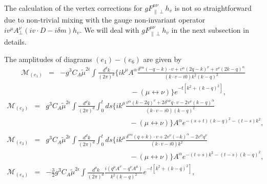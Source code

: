 The calculation of the vertex corrections for $gF^{\mu\nu}_{\|\perp}h_v$ is not so straightforward due to non-trivial mixing with the gauge non-invariant operator $iv^{\mu}A_{\perp}^{\nu}(iv\cdot D - i\delta m) h_v$.
We will deal with $gF^{\mu\nu}_{\|\perp}h_v$ in the next subsection in details. 

The amplitudes of diagrams $(e_1) - (e_6)$ are given by
\begin{eqnarray}
\label{eq:e1}
\mathcal{M}_{(e_1)} 
&=&-g^3C_A\tilde{\mu}^{2\epsilon}\int\frac{d^dk}{(2\pi)^d}\bigg\{ik^{\mu}A^{\alpha}\frac{\delta^{\nu\alpha}\left(-q-k\right)\cdot v+v^{\alpha}\left(2q-k\right)^{\nu}+v^{\nu}\left(2k-q\right)^{\alpha}}{(k\cdot v- i0)k^2(k-q)^2}\nonumber\\
&&\, \, \, \, \, \, \, \, \, \, \, \, \, \, \, \, \, \, \, \, \, \, \, \, \, \, \, \, \, \, \, \, \, \, \, \, \, \, \, \, \, \, \, \, \, \, \, \, \, \, \, \, \,  \, \, \, \, \, \, -\left(\mu\leftrightarrow\nu\right)\bigg\}e^{-t\left[k^2+(k-q)^2\right]},
\end{eqnarray}
\begin{eqnarray}
\label{eq:e2}
\mathcal{M}_{(e_2)} 
&=&g^3C_A\tilde{\mu}^{2\epsilon}\int\frac{d^dk}{(2\pi)^d}\int_0^t ds\bigg\{ik^{\mu}\frac{v^{\alpha}\left(k-2q\right)^{\nu}+2\delta^{\alpha \nu}q\cdot v-2v^{\nu}(k-q)^{\alpha}}{(k\cdot v- i0)(k-q)^2}\nonumber\\
&&\, \, \, \, \, \, \, \, \, \, \, \, \, \, \, \, \, \, \, \, \, \, \, \, \, \, \, \, \, \, \, \, \, \, \, \, \, \, \, \, \, \, \, \, \, \, \, \, \, \, \, \, \,  \, \, \, \, \, \, \, \, \, \, \, \, \, \,  \, \, \, -\left(\mu\leftrightarrow\nu\right)\bigg\}A^{\alpha}e^{-(s+t)(k-q)^2-(t-s)k^2},\\\nonumber\\
\label{eq:e3}
\mathcal{M}_{(e_3)} 
&=&g^3C_A\tilde{\mu}^{2\epsilon}\int\frac{d^dk}{(2\pi)^d}\int_0^t ds\bigg\{ik^{\mu}\frac{\delta^{\nu\alpha}\left(q+k\right)\cdot v+2v^{\nu}(-k)^{\alpha}-2v^{\alpha}q^{\nu}}{(k\cdot v- i0)k^2}\nonumber\\
&&\, \, \, \, \, \, \, \, \, \, \, \, \, \, \, \, \, \, \, \, \, \, \, \, \, \, \, \, \, \, \, \, \, \, \, \, \, \, \, \, \, \, \, \, \, \, \, \, \, \, \, \, \, \, \, \, \, \, \, \, \, \, \, \, \, \, \, \, \, \,  -\left(\mu\leftrightarrow\nu\right)\bigg\}A^{\alpha}e^{-(t+s)k^2-(t-s)(k-q)^2},\\
\label{eq:e4}
\mathcal{M}_{(e_4)} 
&=&-\frac{3}{2}g^3C_A\tilde{\mu}^{2\epsilon}\int\frac{d^dk}{(2\pi)^d } \frac{i\left(q^{\mu}A^{\nu}-q^{\nu}A^{\mu}\right)}{k^2(k-q)^2}e^{-t\left[k^2+(k-q)^2\right]},
\end{eqnarray}
